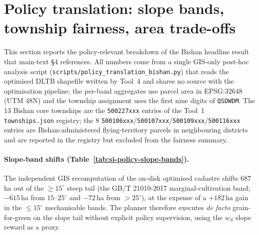 \documentclass[11pt]{article}
\begin{document}
\section{Policy translation: slope bands, township fairness, area trade-offs}\label{si:policy-translation}

This section reports the policy-relevant breakdown of the Bishan headline result that main-text \S4 references. All numbers come from a single GIS-only post-hoc analysis script (\texttt{scripts/policy\_translation\_bishan.py}) that reads the optimised DLTB shapefile written by Tool~4 and shares no source with the optimisation pipeline; the per-band aggregates use parcel area in EPSG:32648 (UTM 48N) and the township assignment uses the first nine digits of \texttt{QSDWDM}. The 13 Bishan core townships are the \texttt{500227xxx} entries of the Tool~1 \texttt{townships.json} registry; the 8 \texttt{500106xxx}/\texttt{500107xxx}/\texttt{500109xxx}/\texttt{500116xxx} entries are Bishan-administered flying-territory parcels in neighbouring districts and are reported in the registry but excluded from the fairness summary.

\paragraph{Slope-band shifts (Table~\ref{tab:si-policy-slope-bands}).} The independent GIS recomputation of the on-disk optimised cadastre shifts $687$\,ha out of the $\geq 15^{\circ}$ steep tail (the GB/T 21010-2017 marginal-cultivation band; $-615$\,ha from $15$--$25^{\circ}$ and $-72$\,ha from $>25^{\circ}$), at the expense of a $+182$\,ha gain in the $\leq 15^{\circ}$ mechanisable bands. The planner therefore executes \emph{de facto} grain-for-green on the slope tail without explicit policy supervision, using the $w_S$ slope reward as a proxy.
\end{document}
